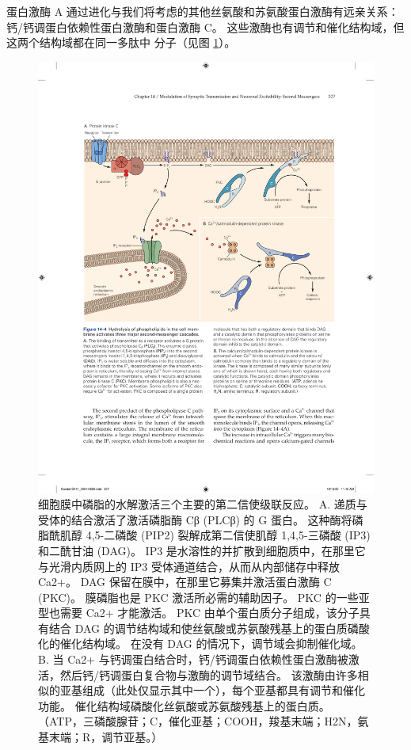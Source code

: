 蛋白激酶 A 通过进化与我们将考虑的其他丝氨酸和苏氨酸蛋白激酶有远亲关系：钙/钙调蛋白依赖性蛋白激酶和蛋白激酶 C。
这些激酶也有调节和催化结构域，但这两个结构域都在同一多肽中 分子（见图 \ref{fig:14_4}）。

\begin{figure}[htbp]
	\centering
	\includegraphics[width=0.95\linewidth]{chap14/fig_14_4}
	\caption{细胞膜中磷脂的水解激活三个主要的第二信使级联反应。 A. 递质与受体的结合激活了激活磷脂酶 Cβ (PLCβ) 的 G 蛋白。 这种酶将磷脂酰肌醇 4,5-二磷酸 (PIP2) 裂解成第二信使肌醇 1,4,5-三磷酸 (IP3) 和二酰甘油 (DAG)。 IP3 是水溶性的并扩散到细胞质中，在那里它与光滑内质网上的 IP3 受体通道结合，从而从内部储存中释放 Ca2+。 DAG 保留在膜中，在那里它募集并激活蛋白激酶 C (PKC)。 膜磷脂也是 PKC 激活所必需的辅助因子。 PKC 的一些亚型也需要 Ca2+ 才能激活。 PKC 由单个蛋白质分子组成，该分子具有结合 DAG 的调节结构域和使丝氨酸或苏氨酸残基上的蛋白质磷酸化的催化结构域。 在没有 DAG 的情况下，调节域会抑制催化域。 B. 当 Ca2+ 与钙调蛋白结合时，钙/钙调蛋白依赖性蛋白激酶被激活，然后钙/钙调蛋白复合物与激酶的调节域结合。 该激酶由许多相似的亚基组成（此处仅显示其中一个），每个亚基都具有调节和催化功能。 催化结构域磷酸化丝氨酸或苏氨酸残基上的蛋白质。 （ATP，三磷酸腺苷；C，催化亚基；COOH，羧基末端；H2N，氨基末端；R，调节亚基。）}
	\label{fig:14_4}
\end{figure}


